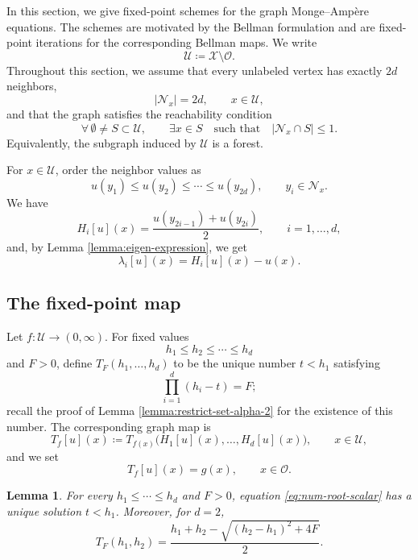 \documentclass[reqno,11pt]{amsart}
\numberwithin{equation}{section}
\newtheorem{lemma}[theorem]{Lemma}
\theoremstyle{definition}
\theoremstyle{remark}
\begin{document}
In this section, we give fixed-point schemes for the graph Monge--Amp\`ere equations. The schemes are motivated by the Bellman formulation and are fixed-point iterations for the corresponding Bellman maps. We write
\[
    \mathcal{U}\coloneqq \mathcal X\setminus\mathcal O.
\]
Throughout this section, we assume that every unlabeled vertex has exactly \(2d\) neighbors,
\[
    |\mathcal N_x|=2d,
    \qquad x\in \mathcal{U},
\]
and that the graph satisfies the reachability condition
\begin{equation}\label{eq:num-plucking-assumption}
    \forall\,\emptyset\ne S\subset \mathcal{U},
    \qquad
    \exists x\in S
    \quad\text{such that}\quad
    |\mathcal N_x\cap S|\le 1 .
\end{equation}
Equivalently, the subgraph induced by \(\mathcal{U}\) is a forest. 

For \(x\in \mathcal{U}\), order the neighbor values as
\[
    u(y_1)\le u(y_2)\le\cdots\le u(y_{2d}),
    \qquad y_i\in\mathcal N_x.
\]
We have
\[
    H_i[u](x) = \frac{u(y_{2i-1})+u(y_{2i})}{2},
    \qquad i=1,\dots,d,
\]
and, by Lemma \ref{lemma:eigen-expression}, we get
\[
    \lambda_i[u](x)=H_i[u](x)-u(x).
\]

\subsection{The fixed-point map}

Let \(f\colon \mathcal{U}\to(0,\infty)\).  For fixed values
\[
    h_1\le h_2\le\cdots\le h_d
\]
and \(F>0\), define \(T_F(h_1,\dots,h_d)\) to be the unique number \(t<h_1\) satisfying
\begin{equation}\label{eq:num-root-scalar}
    \prod_{i=1}^d (h_i-t)=F;
\end{equation}
recall the proof of Lemma \ref{lemma:restrict-set-alpha-2} for the existence of this number. The corresponding graph map is
\[
    T_f[u](x)
    \coloneqq
    T_{f(x)}\bigl(H_1[u](x),\dots,H_d[u](x)\bigr),
    \qquad x\in \mathcal{U},
\]
and we set 
$$T_f[u] (x)=g (x) , \qquad x\in \mathcal O .$$

\begin{lemma}\label{lem:num-root}
For every \(h_1\le \cdots\le h_d\) and \(F>0\), equation \eqref{eq:num-root-scalar} has a unique solution \(t<h_1\). Moreover, for \(d=2\),
\begin{equation}\label{eq:num-d2-root}
    T_F(h_1,h_2)
    =
    \frac{
        h_1+h_2
        -
        \sqrt{(h_2-h_1)^2+4F}
    }{2}.
\end{equation}
\end{lemma}
\end{document}
